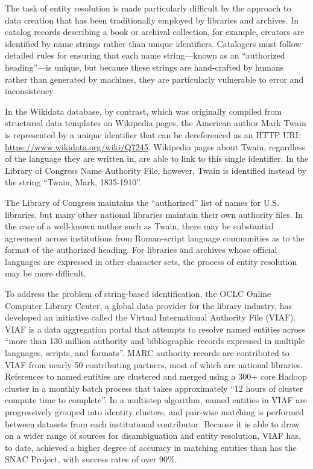 \documentclass[sigconf]{acmart}
\begin{document}
The task of entity resolution is made particularly difficult by the approach to data creation that has been traditionally employed by libraries and archives. In catalog records describing a book or archival collection, for example, creators are identified by name strings rather than unique identifiers. Catalogers must follow detailed rules for ensuring that each name string---known as an ``authorized heading''---is unique, but because these strings are hand-crafted by humans rather than generated by machines, they are particularly vulnerable to error and inconsistency.

In the Wikidata database, by contrast, which was originally compiled from structured data templates on Wikipedia pages, the American author Mark Twain is represented by a unique identifier that can be dereferenced as an HTTP URI: \url{https://www.wikidata.org/wiki/Q7245}. Wikipedia pages about Twain, regardless of the language they are written in, are able to link to this single identifier. In the Library of Congress Name Authority File, however, Twain is identified instead by the string ``Twain, Mark, 1835-1910''.

The Library of Congress maintains the ``authorized'' list of names for U.S. libraries, but many other national libraries maintain their own authority files. In the case of a well-known author such as Twain, there may be substantial agreement across institutions from Roman-script language communities as to the format of the authorized heading. For libraries and archives whose official languages are expressed in other character sets, the process of entity resolution may be more difficult.

To address the problem of string-based identification, the OCLC Online Computer Library Center, a global data provider for the library industry, has developed an initiative called the Virtual International Authority File (VIAF). VIAF is a data aggregation portal that attempts to resolve named entities across ``more than 130 million authority and bibliographic records expressed in multiple languages, scripts, and formats''\cite[p.~1]{tH14}. MARC authority records are contributed to VIAF from nearly 50 contributing partners, most of which are national libraries\cite{tH14}. References to named entities are clustered and merged using a 300+ core Hadoop cluster in a monthly batch process that takes approximately ``12 hours of cluster compute time to complete''\cite[p.~2]{tH14}. In a multistep algorithm, named entities in VIAF are progressively grouped into identity clusters, and pair-wise matching is performed between datasets from each institutional contributor. Because it is able to draw on a wider range of sources for disambiguation and entity resolution, VIAF has, to date, achieved a higher degree of accuracy in matching entities than has the SNAC Project, with success rates of over 90\%\cite{tH14}.
\end{document}
